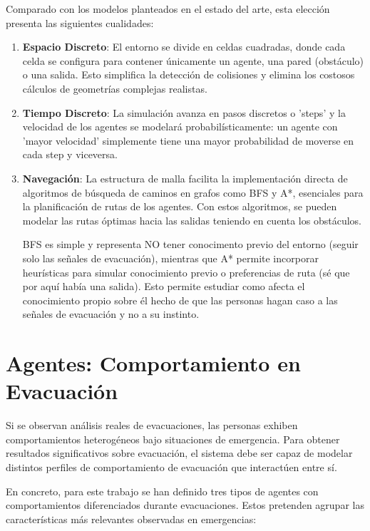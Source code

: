 \documentclass[11pt,spanish,listoffigures,listoftables]{tfgetsinf}
\begin{document}
Comparado con los modelos planteados en el estado del arte, esta elección presenta las siguientes cualidades:
\begin{enumerate}
    \item \textbf{Espacio Discreto}: El entorno se divide en celdas cuadradas, donde cada celda se configura para contener únicamente un agente, una pared (obstáculo) o una salida. Esto simplifica la detección de colisiones y elimina los costosos cálculos de geometrías complejas realistas.
    \item \textbf{Tiempo Discreto}: La simulación avanza en pasos discretos o 'steps' y la velocidad de los agentes se modelará probabilísticamente: un agente con 'mayor velocidad' simplemente tiene una mayor probabilidad de moverse en cada step y viceversa.
    \item \textbf{Navegación}: La estructura de malla facilita la implementación directa de algoritmos de búsqueda de caminos en grafos como BFS y A*, esenciales para la planificación de rutas de los agentes. Con estos algoritmos, se pueden modelar las rutas óptimas hacia las salidas teniendo en cuenta los obstáculos.
    
    BFS es simple y representa NO tener conocimento previo del entorno (seguir solo las señales de evacuación), mientras que A* permite incorporar heurísticas para simular conocimiento previo o preferencias de ruta (sé que por aquí había una salida). Esto permite estudiar como afecta el conocimiento propio sobre él hecho de que las personas hagan caso a las señales de evacuación y no a su instinto.
\end{enumerate}

\section{Agentes: Comportamiento en Evacuación}

Si se observan análisis reales de evacuaciones, las personas exhiben comportamientos heterogéneos bajo situaciones de emergencia. Para obtener resultados significativos sobre evacuación, el sistema debe ser capaz de modelar distintos perfiles de comportamiento de evacuación que interactúen entre sí. 

En concreto, para este trabajo se han definido tres tipos de agentes con comportamientos diferenciados durante evacuaciones. Estos pretenden agrupar las características más relevantes observadas en emergencias:
\end{document}
